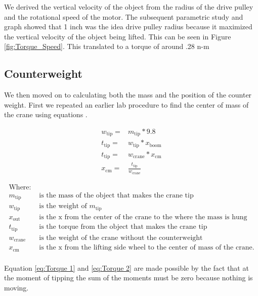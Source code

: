 \documentclass[twocolumn, letterpaper, 12pt, twoside]{article}
\begin{document}
We derived the vertical velocity of the object from the radius of the drive pulley and the rotational speed of the motor. 
The subsequent parametric study and graph showed that 1 inch was the idea drive pulley radius because it maximized the vertical velocity of the object being lifted.  This can be seen in Figure \ref{fig:Torque_Speed}.
This translated to a torque of around .28 n-m


\subsection{Counterweight}
\label{sec:Counterweight}
We then moved on to calculating both the mass and the position of the counter weight. 
First we repeated an earlier lab procedure to find the center of mass of the crane using equations    . 

\begin{align}
        w_{\text{tip}}= & m_{\text{tip}} * 9.8 \\
        t_{\text{tip}}= & w_{\text{tip}}*x_{\text{boom}}\label{eq:Torque 1} \\ 
        t_{\text{tip}}= & w_{\text{crane}}*x_{\text{cm}}\label{eq:Torque 2} \\
        x_{\text{cm}}= & \frac{t_{\text{tip}}}{w_{\text{crane}}}
\end{align}

\begin{equation}
    \begin{split}
        \text{Where:} \\
        m_{\text{tip}} & \text{ is the mass of the object that makes the crane tip} \\
        w_{\text{tip}} & \text{ is the weight of } m_{\text{tip}} \\
        x_{\text{out}} & \text{ is the x from the center of the crane to the where the mass is hung} \\
        t_{\text{tip}} & \text{ is the torque from the object that makes the crane tip} \\
        w_{\text{crane}} & \text{ is the weight of the crane without the counterweight} \\
        x_{\text{cm}} & \text{ is the x from the lifting side wheel to the center of mass of the crane.} \\
    \end{split}
\end{equation}

Equation \ref{eq:Torque 1} and \ref{eq:Torque 2} are made possible by the fact that at the moment of tipping the sum of the moments must be zero because nothing is moving.
\end{document}
